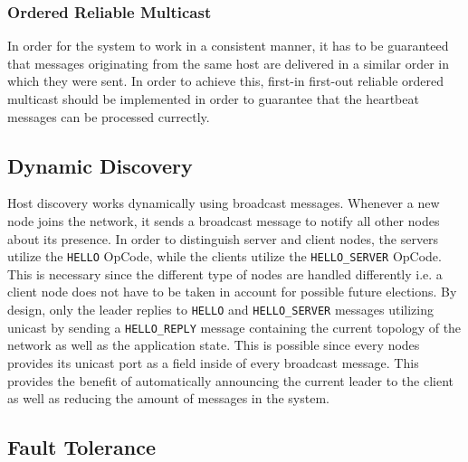 \documentclass[runningheads]{llncs}
\begin{document}
\subsubsection{Ordered Reliable Multicast}

In order for the system to work in a consistent manner, it has to be guaranteed
that messages originating from the same host are delivered in a similar order
in which they were sent. In order to achieve this, first-in first-out reliable
ordered multicast should be implemented in order to guarantee that the heartbeat
messages can be processed currectly.

\subsection{Dynamic Discovery}

Host discovery works dynamically using broadcast messages.
Whenever a new node joins the network, it sends a broadcast message to notify
all other nodes about its presence.
\newline
\newline
In order to distinguish server and client
nodes, the servers utilize the \texttt{HELLO} OpCode, while the clients utilize the
\texttt{HELLO\_SERVER} OpCode. This is necessary since the different type of nodes are
handled differently i.e. a client node does not have to be taken in account for
possible future elections. By design, only the leader replies to \texttt{HELLO} and
\texttt{HELLO\_SERVER} messages utilizing unicast by sending a \texttt{HELLO\_REPLY} message
containing the current topology of the network as well as the application
state. This is possible since every nodes provides its unicast port as a field
inside of every broadcast message. This provides the benefit of automatically
announcing the current leader to the client as well as reducing the amount of
messages in the system.

\subsection{Fault Tolerance}
\end{document}
